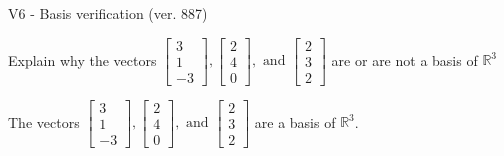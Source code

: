 \begin{exercise}
  \begin{exerciseTitle}V6 - Basis verification (ver. 887)\end{exerciseTitle}
  \begin{exerciseStatement}
    Explain why the vectors \(\left[\begin{array}{r}
3 \\
1 \\
-3
\end{array}\right] , \left[\begin{array}{r}
2 \\
4 \\
0
\end{array}\right] , \text{ and } \left[\begin{array}{r}
2 \\
3 \\
2
\end{array}\right]\) are or are not a basis of \(\mathbb{R}^3\)	


  \end{exerciseStatement}
  \begin{exerciseAnswer}
   The vectors \(\left[\begin{array}{r}
3 \\
1 \\
-3
\end{array}\right] , \left[\begin{array}{r}
2 \\
4 \\
0
\end{array}\right] , \text{ and } \left[\begin{array}{r}
2 \\
3 \\
2
\end{array}\right]\) 
  	 are  a basis of \(\mathbb{R}^3\).
  


  \end{exerciseAnswer}
\end{exercise}